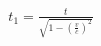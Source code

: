 \documentclass[preview]{standalone}
\begin{document}
\begin{align*}
t_1 = \frac{t}{\sqrt{1 - \left(\frac{v}{c}\right)^2}}
\end{align*}
\end{document}
